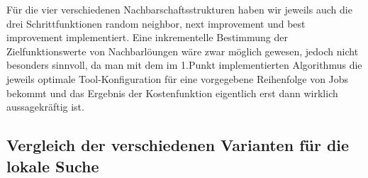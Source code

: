 \documentclass[a4paper,10pt]{article}
\begin{document}
F\"{u}r die vier verschiedenen Nachbarschaftsstrukturen haben wir jeweils auch die drei Schrittfunktionen random neighbor, next improvement und best improvement implementiert. Eine inkrementelle Bestimmung der Zielfunktionswerte von Nachbarl\"{o}ungen w\"{a}re zwar m\"{o}glich gewesen, jedoch nicht besonders sinnvoll, da man mit dem im 1.Punkt implementierten Algorithmus die jeweils optimale Tool-Konfiguration f\"{u}r eine vorgegebene Reihenfolge von Jobs bekommt und das Ergebnis der Kostenfunktion eigentlich erst dann wirklich aussagekr\"{a}ftig ist.

\subsection{Vergleich der verschiedenen Varianten f\"{u}r die lokale Suche}
\end{document}
